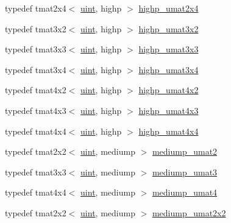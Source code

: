 \begin{DoxyCompactItemize}
typedef tmat2x4$<$ \hyperlink{stb__image_8c_a91ad9478d81a7aaf2593e8d9c3d06a14}{uint}, highp $>$ \hyperlink{group__gtc__matrix__integer_gafcec07e857ea0445d93680411e86482c}{highp\+\_\+umat2x4}
\item 
typedef tmat3x2$<$ \hyperlink{stb__image_8c_a91ad9478d81a7aaf2593e8d9c3d06a14}{uint}, highp $>$ \hyperlink{group__gtc__matrix__integer_ga7484178233773045088b42f362dade86}{highp\+\_\+umat3x2}
\item 
typedef tmat3x3$<$ \hyperlink{stb__image_8c_a91ad9478d81a7aaf2593e8d9c3d06a14}{uint}, highp $>$ \hyperlink{group__gtc__matrix__integer_ga770b01686af4fbbb13bbd7bd97d60fe4}{highp\+\_\+umat3x3}
\item 
typedef tmat3x4$<$ \hyperlink{stb__image_8c_a91ad9478d81a7aaf2593e8d9c3d06a14}{uint}, highp $>$ \hyperlink{group__gtc__matrix__integer_gaa2fb29026c9c80c7d17b5389e36d6aa7}{highp\+\_\+umat3x4}
\item 
typedef tmat4x2$<$ \hyperlink{stb__image_8c_a91ad9478d81a7aaf2593e8d9c3d06a14}{uint}, highp $>$ \hyperlink{group__gtc__matrix__integer_ga4015bf99a981bf271fd516f9b2cb6724}{highp\+\_\+umat4x2}
\item 
typedef tmat4x3$<$ \hyperlink{stb__image_8c_a91ad9478d81a7aaf2593e8d9c3d06a14}{uint}, highp $>$ \hyperlink{group__gtc__matrix__integer_gaa394320db559302e18c8b64013b8d7fb}{highp\+\_\+umat4x3}
\item 
typedef tmat4x4$<$ \hyperlink{stb__image_8c_a91ad9478d81a7aaf2593e8d9c3d06a14}{uint}, highp $>$ \hyperlink{group__gtc__matrix__integer_gaf5365128f6fd506442843fb5a441f385}{highp\+\_\+umat4x4}
\item 
typedef tmat2x2$<$ \hyperlink{stb__image_8c_a91ad9478d81a7aaf2593e8d9c3d06a14}{uint}, mediump $>$ \hyperlink{group__gtc__matrix__integer_ga85bc35173415dba31bb964c2940feeec}{mediump\+\_\+umat2}
\item 
typedef tmat3x3$<$ \hyperlink{stb__image_8c_a91ad9478d81a7aaf2593e8d9c3d06a14}{uint}, mediump $>$ \hyperlink{group__gtc__matrix__integer_ga953d4cb3e70d85567756b3fbcca0e9e9}{mediump\+\_\+umat3}
\item 
typedef tmat4x4$<$ \hyperlink{stb__image_8c_a91ad9478d81a7aaf2593e8d9c3d06a14}{uint}, mediump $>$ \hyperlink{group__gtc__matrix__integer_ga3eb3a5d85ec876ba65fad5525a5dda56}{mediump\+\_\+umat4}
\item 
typedef tmat2x2$<$ \hyperlink{stb__image_8c_a91ad9478d81a7aaf2593e8d9c3d06a14}{uint}, mediump $>$ \hyperlink{group__gtc__matrix__integer_gafce8777b8b0d9d7f810853b22de3be1b}{mediump\+\_\+umat2x2}
\item 

\end{DoxyCompactItemize}

